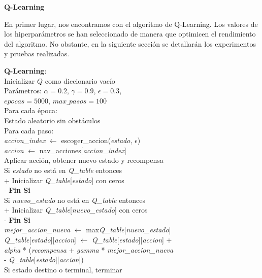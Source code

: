 \documentclass[conference,a4paper]{IEEEtran}
\begin{document}
\textbf{Q-Learning \newline}

En primer lugar, nos encontramos con el algoritmo de Q-Learning. Los valores de los hiperparámetros se han seleccionado de manera que optimicen el rendimiento del algoritmo. 
No obstante, en la siguiente sección se detallarán los experimentos y pruebas realizadas.

  \begin{pseudo}[compact]
    \textbf{Q-Learning}: \\
    Inicializar $Q$ como diccionario vacío \\
    Parámetros: $\alpha = 0.2$, $\gamma = 0.9$, $\epsilon = 0.3$, \\ $epocas = 5000$, $max\_pasos = 100$ \\
    Para cada época: \\
    \> Estado aleatorio sin obstáculos \\
    \> Para cada paso: \\
    \> \> \textit{accion\_index} $\leftarrow$ escoger\_accion(\textit{estado}, $\epsilon$) \\
    \> \> \textit{accion} $\leftarrow$ nav\_acciones[\textit{accion\_index}] \\
    \> \> Aplicar acción, obtener nuevo estado y recompensa \\
    Si \textit{estado} no está en \textit{Q\_table} entonces \\+
      Inicializar \textit{Q\_table}[\textit{estado}] con ceros \\-
    \textbf{Fin Si} \\
    Si \textit{nuevo\_estado} no está en \textit{Q\_table} entonces \\+
      Inicializar \textit{Q\_table}[\textit{nuevo\_estado}] con ceros \\-
    \textbf{Fin Si} \\
    \textit{mejor\_accion\_nueva} $\leftarrow$ max\textit{Q\_table}[\textit{nuevo\_estado}] \\
    \textit{Q\_table}[\textit{estado}][\textit{accion}] $\leftarrow$ \textit{Q\_table}[\textit{estado}][\textit{accion}] + \\
    \> \textit{alpha} * (\textit{recompensa} + \textit{gamma} * \textit{mejor\_accion\_nueva}\\
    \> - \textit{Q\_table}[\textit{estado}][\textit{accion}])\\
    \> Si estado destino o terminal, terminar \\
  \end{pseudo}
\end{document}
